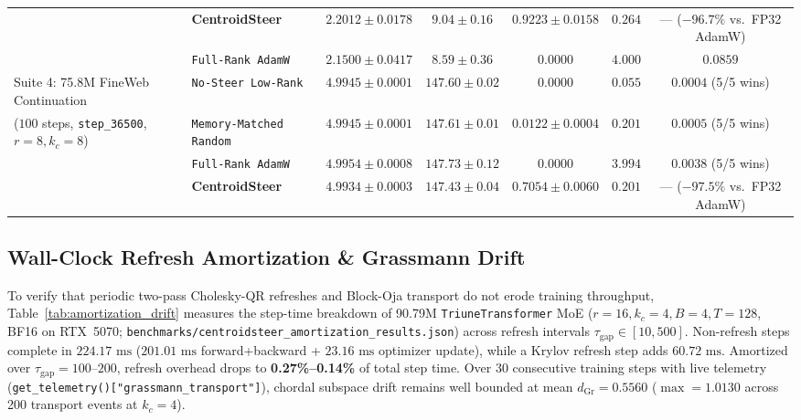 \documentclass[10pt,twocolumn,letterpaper]{article}
\begin{document}
\begin{table}[t]
{\begin{tabular}{llccccc}
 & \textbf{CentroidSteer} & $\mathbf{2.2012 \pm 0.0178}$ & $\mathbf{9.04 \pm 0.16}$ & $\mathbf{0.9223 \pm 0.0158}$ & $\mathbf{0.264}$ & --- ($-96.7\%$ vs.\ FP32 AdamW) \\
 & \texttt{Full-Rank AdamW} & $2.1500 \pm 0.0417$ & $8.59 \pm 0.36$ & $0.0000$ & $4.000$ & $0.0859$ \\
\midrule
Suite 4: 75.8M FineWeb Continuation & \texttt{No-Steer Low-Rank} & $4.9945 \pm 0.0001$ & $147.60 \pm 0.02$ & $0.0000$ & $0.055$ & $\mathbf{0.0004}$ (5/5 wins) \\
($100$ steps, \texttt{step\_36500}, $r=8, k_c=8$) & \texttt{Memory-Matched Random} & $4.9945 \pm 0.0001$ & $147.61 \pm 0.01$ & $0.0122 \pm 0.0004$ & $0.201$ & $\mathbf{0.0005}$ (5/5 wins) \\
 & \texttt{Full-Rank AdamW} & $4.9954 \pm 0.0008$ & $147.73 \pm 0.12$ & $0.0000$ & $3.994$ & $\mathbf{0.0038}$ (5/5 wins) \\
 & \textbf{CentroidSteer} & $\mathbf{4.9934 \pm 0.0003}$ & $\mathbf{147.43 \pm 0.04}$ & $\mathbf{0.7054 \pm 0.0060}$ & $\mathbf{0.201}$ & --- ($-97.5\%$ vs.\ FP32 AdamW) \\
\bottomrule
\end{tabular}%
}
\end{table}

\subsection{Wall-Clock Refresh Amortization \& Grassmann Drift}
\label{sec:amortization_drift}

To verify that periodic two-pass Cholesky-QR refreshes and Block-Oja transport do not erode training throughput, Table~\ref{tab:amortization_drift} measures the step-time breakdown of 90.79M \texttt{TriuneTransformer} MoE ($r=16, k_c=4, B=4, T=128$, BF16 on RTX~5070; \nolinkurl{benchmarks/centroidsteer_amortization_results.json}) across refresh intervals $\tau_{\text{gap}} \in [10, 500]$. Non-refresh steps complete in $224.17\text{ ms}$ ($201.01\text{ ms}$ forward+backward + $23.16\text{ ms}$ optimizer update), while a Krylov refresh step adds $60.72\text{ ms}$. Amortized over $\tau_{\text{gap}} = 100$--$200$, refresh overhead drops to \textbf{0.27\%--0.14\%} of total step time. Over 30 consecutive training steps with live telemetry (\texttt{get\_telemetry()[\allowbreak"grassmann\_\allowbreak{}transport"]}), chordal subspace drift remains well bounded at mean $d_{\text{Gr}} = 0.5560$ ($\max = 1.0130$ across 200 transport events at $k_c=4$).
\end{document}

